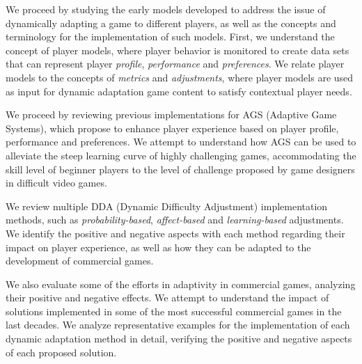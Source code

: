 We proceed by studying the early models developed to address the issue of dynamically adapting a game to different players, as well as the concepts and terminology for the implementation of such models. First, we understand the concept of player models, where player behavior is monitored to create data sets that can represent player \emph{profile}, \emph{performance} and \emph{preferences}. We relate player models to the concepts of \emph{metrics} and \emph{adjustments}, where player models are used as input for dynamic adaptation game content to satisfy contextual player needs.

We proceed by reviewing previous implementations for AGS (Adaptive Game Systems), which propose to enhance player experience based on player profile, performance and preferences. We attempt to understand how AGS can be used to alleviate the steep learning curve of highly challenging games, accommodating the skill level of beginner players to the level of challenge proposed by game designers in difficult video games.

We review multiple DDA (Dynamic Difficulty Adjustment) implementation methods, such as \emph{probability-based}, \emph{affect-based} and \emph{learning-based} adjustments. We identify the positive and negative aspects with each method regarding their impact on player experience, as well as how they can be adapted to the development of commercial games.

We also evaluate some of the efforts in adaptivity in commercial games, analyzing their positive and negative effects. We attempt to understand the impact of solutions implemented in some of the most successful commercial games in the last decades. We analyze representative examples for the implementation of each dynamic adaptation method in detail, verifying the positive and negative aspects of each proposed solution.

